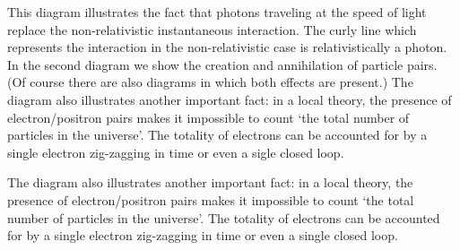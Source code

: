 \documentclass[11pt]{article}
\begin{document}
\begin{center}


\end{center}

This diagram illustrates the fact that photons traveling at the speed of light
replace the non-relativistic instantaneous interaction. The curly line
which represents the interaction in the non-relativistic case is relativistically
a photon.
In the second diagram
we show the creation and annihilation of particle pairs. (Of course there
are also diagrams in which both effects are present.) The diagram also illustrates
another important fact:
in a local theory,
the presence of electron/positron pairs makes it impossible
to count `the total number of particles in the universe'. The totality of
electrons can be accounted for by a single electron zig-zagging in time or even
a sigle closed loop.



\begin{center}


\end{center}

 The diagram also illustrates
another important fact:
in a local theory,
the presence of electron/positron pairs makes it impossible
to count `the total number of particles in the universe'. The totality of
electrons can be accounted for by a single electron zig-zagging in time or even
a single closed loop.

\begin{center}


\end{center}
\end{document}
